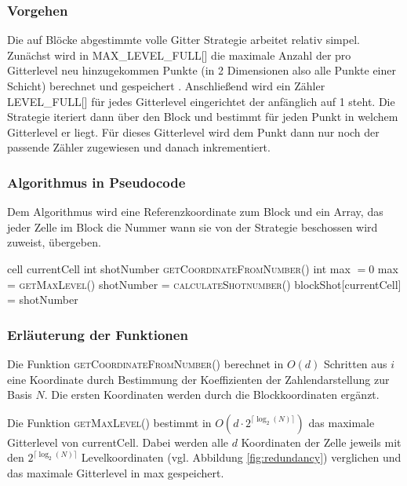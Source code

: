 \documentclass[a4paper,12pt]{llncs}
\numberwithin{equation}{section}
\begin{document}
\subsubsection{Vorgehen}

Die auf Blöcke abgestimmte volle Gitter Strategie arbeitet relativ simpel. Zunächst wird in MAX\_LEVEL\_FULL[] die maximale Anzahl der pro Gitterlevel neu hinzugekommen Punkte (in 2 Dimensionen also alle Punkte einer Schicht) berechnet und gespeichert . Anschließend wird ein Zähler LEVEL\_FULL[] für jedes Gitterlevel eingerichtet der anfänglich auf 1 steht. Die Strategie iteriert dann über den Block und bestimmt für jeden Punkt in welchem Gitterlevel er liegt. Für dieses Gitterlevel wird dem Punkt dann nur noch der passende Zähler zugewiesen und danach inkrementiert.

\subsubsection{Algorithmus in Pseudocode}

Dem Algorithmus wird eine Referenzkoordinate zum Block und ein Array, das jeder Zelle im Block die Nummer wann sie von der Strategie beschossen wird zuweist, übergeben.

\begin{tcolorbox}
	\begin{algorithmic}
		\State cell currentCell
		\State int shotNumber
		\State \textsc{getCoordinateFromNumber}()
		\State int max $=0$
		\State max = \textsc{getMaxLevel}()
		\State shotNumber = \textsc{calculateShotnumber}()
		\State blockShot[currentCell] = shotNumber
		\EndFor
		\EndFunction
	\end{algorithmic}
\end{tcolorbox}

\subsubsection{Erläuterung der Funktionen}
Die Funktion \textsc{getCoordinateFromNumber}() berechnet in $O(d)$ Schritten aus $i$ eine Koordinate durch Bestimmung der Koeffizienten der Zahlendarstellung zur Basis $N$. Die ersten Koordinaten werden durch die Blockkoordinaten ergänzt.

Die Funktion \textsc{getMaxLevel}() bestimmt in $O\left(d\cdot 2^{\lceil\log_2(N)\rceil}\right)$ das maximale Gitterlevel von currentCell. Dabei werden alle $d$ Koordinaten der Zelle jeweils mit den $2^{\lceil\log_2(N)\rceil}$ Levelkoordinaten (vgl. Abbildung \ref{fig:redundancy}) verglichen und das maximale Gitterlevel in max gespeichert.
\end{document}
